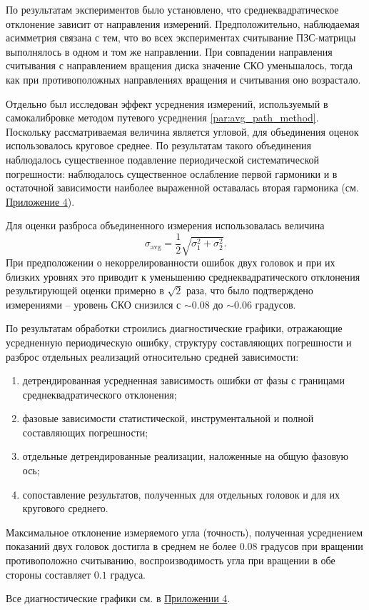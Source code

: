 По результатам экспериментов было установлено, что среднеквадратическое отклонение зависит от направления измерений. Предположительно, наблюдаемая асимметрия связана с тем, что во всех экспериментах считывание ПЗС-матрицы выполнялось в одном и том же направлении. При совпадении направления считывания с направлением вращения диска значение СКО уменьшалось, тогда как при противоположных направлениях вращения и считывания оно возрастало.

Отдельно был исследован эффект усреднения измерений, используемый в самокалибровке методом путевого усреднения \ref{par:avg_path_method}. Поскольку рассматриваемая величина является угловой, для объединения оценок использовалось круговое среднее. По результатам такого объединения наблюдалось существенное подавление периодической систематической погрешности: наблюдалось существенное ослабление первой гармоники и в остаточной зависимости наиболее выраженной оставалась вторая гармоника (см. \hyperref[sec:application4]{Приложение 4}).

Для оценки разброса объединенного измерения использовалась величина
\begin{equation*}
\sigma_{\mathrm{avg}} = \frac{1}{2}\sqrt{\sigma_1^2 + \sigma_2^2}.
\end{equation*}
При предположении о некоррелированности ошибок двух головок и при их близких уровнях это приводит к уменьшению среднеквадратического отклонения результирующей оценки примерно в $\sqrt{2}$ раза, что было подтверждено измерениями -- уровень СКО снизился с $\sim0.08$ до $\sim0.06$ градусов.

По результатам обработки строились диагностические графики, отражающие усредненную периодическую ошибку, структуру составляющих погрешности и разброс отдельных реализаций относительно средней зависимости:

\begin{enumerate}
    \item детрендированная усредненная зависимость ошибки от фазы с границами среднеквадратического отклонения;
    \item фазовые зависимости статистической, инструментальной и полной составляющих погрешности;
    \item отдельные детрендированные реализации, наложенные на общую фазовую ось;
    \item сопоставление результатов, полученных для отдельных головок и для их кругового среднего.
\end{enumerate}

Максимальное отклонение измеряемого угла (точность), полученная усреднением показаний двух головок достигла в среднем не более $0.08$ градусов при вращении противоположно считыванию, воспроизводимость угла при вращении в обе стороны составляет $0.1$ градуса.

Все диагностические графики см. в \hyperref[sec:application4]{Приложении 4}.